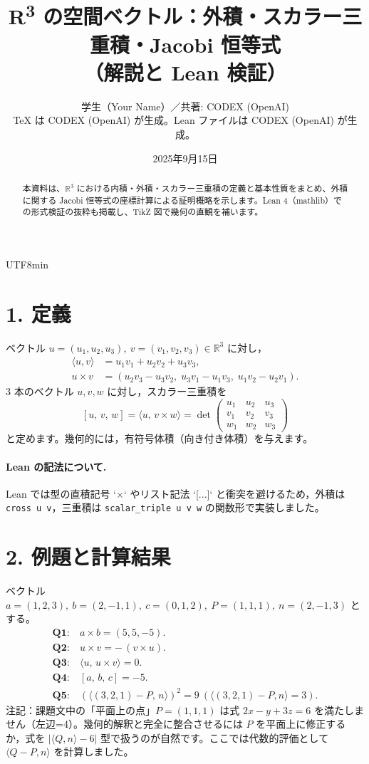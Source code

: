 \documentclass[luatexja,ja=standard,a4paper,12pt]{bxjsarticle}
\title{R\textsuperscript{3} の空間ベクトル：外積・スカラー三重積・Jacobi 恒等式\\（解説と Lean 検証）}
\author{学生（Your Name）／共著: CODEX (OpenAI)\\\small TeX は CODEX (OpenAI) が生成。Lean ファイルは CODEX (OpenAI) が生成。}
\date{2025年9月15日}
\newcommand{\R}{\mathbb{R}}
\newcommand{\cross}{\times}
\newcommand{\triple}[3]{\left[ #1,\,#2,\,#3 \right]}
\begin{document}
\begin{CJK}{UTF8}{min}
\maketitle

\begin{abstract}
本資料は、\(\R^3\) における内積・外積・スカラー三重積の定義と基本性質をまとめ、外積に関する Jacobi 恒等式の座標計算による証明概略を示します。Lean 4（mathlib）での形式検証の抜粋も掲載し、TikZ 図で幾何の直観を補います。
\end{abstract}

\section*{1. 定義}
ベクトル \(u=(u_1,u_2,u_3),\ v=(v_1,v_2,v_3)\in\R^3\) に対し，
\begin{align*}
\langle u,v\rangle &= u_1 v_1 + u_2 v_2 + u_3 v_3,\\
u\cross v &= (u_2 v_3 - u_3 v_2,\; u_3 v_1 - u_1 v_3,\; u_1 v_2 - u_2 v_1).
\end{align*}
3 本のベクトル \(u,v,w\) に対し，スカラー三重積を
\[
\triple{u}{v}{w} = \langle u,\, v\cross w\rangle = \det\begin{pmatrix}
u_1 & u_2 & u_3\\ v_1 & v_2 & v_3\\ w_1 & w_2 & w_3
\end{pmatrix}
\]
と定めます。幾何的には，有符号体積（向き付き体積）を与えます。

\paragraph{Lean の記法について.}
Lean では型の直積記号 `\(\times\)` やリスト記法 `[...]` と衝突を避けるため，外積は \verb|cross u v|，三重積は \verb|scalar_triple u v w| の関数形で実装しました。

\section*{2. 例題と計算結果}
ベクトル \(a=(1,2,3),\ b=(2,-1,1),\ c=(0,1,2),\ P=(1,1,1),\ n=(2,-1,3)\) とする。
\begin{align*}
\textbf{Q1:}\ & a\cross b = (5,5,-5).\\
\textbf{Q2:}\ & u\cross v = -\,(v\cross u).\\
\textbf{Q3:}\ & \langle u,\, u\cross v\rangle = 0.\\
\textbf{Q4:}\ & \triple{a}{b}{c} = -5.\\
\textbf{Q5:}\ & (\langle (3,2,1)-P,\, n\rangle)^2 = 9\ (\langle (3,2,1)-P, n\rangle=3).
\end{align*}
注記：課題文中の「平面上の点」\(P=(1,1,1)\) は式 \(2x-y+3z=6\) を満たしません（左辺=4）。幾何的解釈と完全に整合させるには \(P\) を平面上に修正するか，式を \(|\langle Q,n\rangle-6|\) 型で扱うのが自然です。ここでは代数的評価として \(\langle Q-P,n\rangle\) を計算しました。


\end{CJK}
\end{document}
